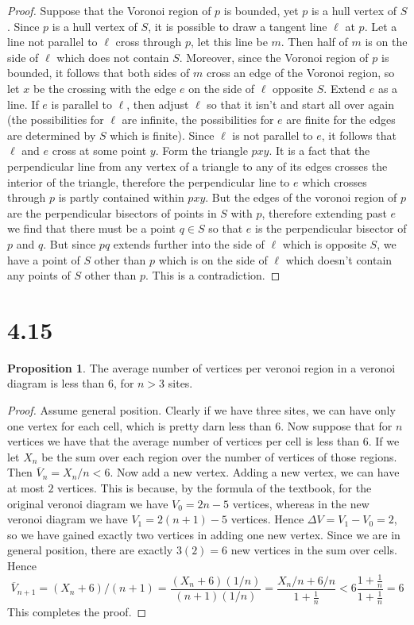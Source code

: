 \documentclass[12pt]{article}
\theoremstyle{definition}
\newtheorem{proposition}{Proposition}
\begin{document}
\begin{proof}
Suppose that the Voronoi region of $p$ is bounded, yet $p$ is a hull vertex of $S$. Since $p$ is a hull vertex of $S$, it is possible to draw a tangent line $\ell$ at $p$. Let a line not parallel to $\ell$ cross through $p$, let this line be $m$. Then half of $m$ is on the side of $\ell$ which does not contain $S$. Moreover, since the Voronoi region of $p$ is bounded, it follows that both sides of $m$ cross an edge of the Voronoi region, so let $x$ be the crossing with the edge $e$ on the side of $\ell$ opposite $S$. Extend $e$ as a line. If $e$ is parallel to $\ell$, then adjust $\ell$ so that it isn't and start all over again (the possibilities for $\ell$ are infinite, the possibilities for $e$ are finite for the edges are determined by $S$ which is finite). Since $\ell$ is not parallel to $e$, it follows that $\ell$ and $e$ cross at some point $y$. Form the triangle $pxy$. It is a fact that the perpendicular line from any vertex of a triangle to any of its edges crosses the interior of the triangle, therefore the perpendicular line to $e$ which crosses through $ p $ is partly contained within $pxy$. But the edges of the voronoi region of $p$ are the perpendicular bisectors of points in $S$ with $p$, therefore extending past $e$ we find that there must be a point $q\in S$ so that $e$ is the perpendicular bisector of $p$ and $q$. But since $pq$ extends further into the side of $\ell$ which is opposite $S$, we have a point of $S$ other than $p$ which is on the side of $\ell$ which doesn't contain any points of $S$ other than $p$. This is a contradiction.

\end{proof}

\section{4.15}

\begin{proposition}
The average number of vertices per veronoi region in a veronoi diagram is less than $6$, for $n> 3$ sites.
\end{proposition}

\begin{proof}
Assume general position. Clearly if we have three sites, we can have only one vertex for each cell, which is pretty darn less than $6$. Now suppose that for $n$ vertices we have that the average number of vertices per cell is less than $6$. If we let $X_n$ be the sum over each region over the number of vertices of those regions. Then $\overline{V}_n = X_n/n < 6$. Now add a new vertex. Adding a new vertex, we can have at most $2$ vertices. This is because, by the formula of the textbook, for the original veronoi diagram we have $V_0 = 2n - 5$ vertices, whereas in the new veronoi diagram we have $V_1 = 2(n + 1)- 5$ vertices. Hence $\Delta V = V_1 - V_0 = 2$, so we have gained exactly two vertices in adding one new vertex. Since we are in general position, there are exactly $3(2) = 6 $ new vertices in the sum over cells.  Hence \[\overline{V}_{n+1} = (X_n + 6) /(n+1) = \frac{(X_n + 6) (1/n)}{(n+1)(1/n)} =  \frac{X_n / n + 6/n}{1 + \frac{1}{n}} < 6\frac{1 + \frac{1}{n}}{1 + \frac{1}{n}} = 6\]
This completes the proof.
\end{proof}
\end{document}
